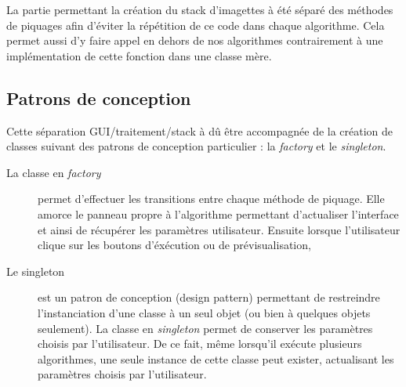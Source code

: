 La partie permettant la création du stack d'imagettes à été séparé des méthodes de piquages afin d'éviter la répétition de ce code dans chaque algorithme. Cela permet aussi d'y faire appel en dehors de nos algorithmes contrairement à une implémentation de cette fonction dans une classe mère.

\subsection*{Patrons de conception}

Cette séparation GUI/traitement/stack à dû être accompagnée de la création de classes suivant des patrons de conception particulier : la \emph{factory} et le \emph{singleton}.
\begin{description}
\item[La classe en \emph{factory}] permet d'effectuer les transitions entre chaque méthode de piquage. Elle amorce le panneau propre à l'algorithme permettant d'actualiser l'interface et ainsi de récupérer les paramètres utilisateur. \blue Ensuite lorsque l'utilisateur clique sur les boutons d'éxécution ou de prévisualisation, \black
\item [Le singleton] est un patron de conception (design pattern) permettant de restreindre l'instanciation d'une classe à un seul objet (ou bien à quelques objets seulement). La classe en \emph{singleton} permet de conserver les paramètres choisis par l'utilisateur. De ce fait, même lorsqu'il exécute plusieurs algorithmes, une seule instance de cette classe peut exister, actualisant les paramètres choisis par l'utilisateur.
\end{description}
%

